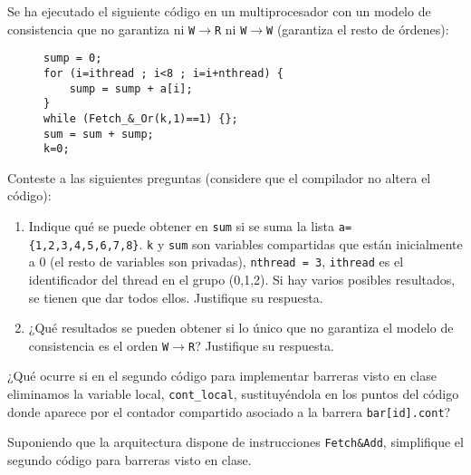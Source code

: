 \begin{ejercicio}
    Se ha ejecutado el siguiente código en un multiprocesador con un modelo de consistencia que no garantiza ni \verb|W|$\to$\verb|R| ni \verb|W|$\to$\verb|W| (garantiza el resto de órdenes):
    \begin{figure}[H]
        \centering
        \begin{verbatim}
sump = 0;
for (i=ithread ; i<8 ; i=i+nthread) {
    sump = sump + a[i];
}
while (Fetch_&_Or(k,1)==1) {};
sum = sum + sump;
k=0;
        \end{verbatim}
    \end{figure}
    Conteste a las siguientes preguntas (considere que el compilador no altera el código):
    \begin{enumerate}
        \item Indique qué se puede obtener en \verb|sum| si se suma la lista \verb|a={1,2,3,4,5,6,7,8}|. \verb|k| y \verb|sum| son variables
        compartidas que están inicialmente a 0 (el resto de variables son privadas), \verb|nthread = 3|, \verb|ithread| es el
        identificador del thread en el grupo (0,1,2). Si hay varios posibles resultados, se tienen que dar todos
        ellos. Justifique su respuesta.
        \item ¿Qué resultados se pueden obtener si lo único que no garantiza el modelo de consistencia es el orden
        \verb|W|$\to$\verb|R|? Justifique su respuesta.
    \end{enumerate}
\end{ejercicio}

\begin{ejercicio}
    ¿Qué ocurre si en el segundo código para implementar barreras visto en clase eliminamos la
    variable local, \verb|cont_local|, sustituyéndola en los puntos del código donde aparece por el contador
    compartido asociado a la barrera \verb|bar[id].cont|?
\end{ejercicio}

\begin{ejercicio}
    Suponiendo que la arquitectura dispone de instrucciones \verb|Fetch&Add|, simplifique el segundo
    código para barreras visto en clase.
\end{ejercicio}

